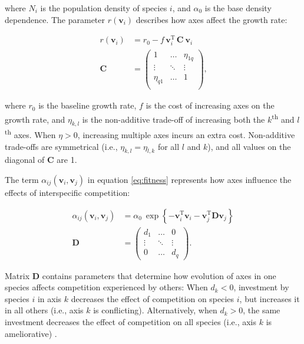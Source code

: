 \noindent where $N_i$ is the population density of species $i$,
and $\alpha_0$ is the base density dependence.
The parameter $r(\mathbf{v}_i)$ describes how axes affect
the growth rate:

\begin{equation} \label{eq:growth-rate}
\begin{split}
    r(\mathbf{v}_i) &= r_0 - f \, \mathbf{v}_i^{\textrm{T}} \, \mathbf{C} ~ \mathbf{v}_{i} \\
    \mathbf{C} &= \begin{pmatrix}
        1         & \ldots & \eta_{1q} \\
        \vdots    & \ddots & \vdots \\
        \eta_{q1} & \ldots & 1      \\
        \end{pmatrix}
    \textrm{,}
\end{split}
\end{equation}

\noindent where $r_0$ is the baseline growth rate,
$f$ is the cost of increasing axes on the growth rate, and
$\eta_{k,l}$ is the non-additive trade-off of increasing both the
$k$\textsuperscript{th} and $l$\textsuperscript{th} axes.
When $\eta > 0$, increasing multiple axes incurs an extra cost.
Non-additive trade-offs are symmetrical (i.e., $\eta_{k,l} = \eta_{l,k}$ for all
$l$ and $k$), and all values on the diagonal of $\mathbf{C}$ are 1.


The term $\alpha_{ij}(\mathbf{v}_i, \mathbf{v}_j)$
in equation \ref{eq:fitness} represents how axes influence the effects
of interspecific competition:

\begin{equation} \label{eq:competition}
\begin{split}
    \alpha_{ij}(\mathbf{v}_i, \mathbf{v}_j) &= \alpha_0 ~\exp \left\{
        - \mathbf{v}_i^{\textrm{T}} \mathbf{v}_i -
        \mathbf{v}_j^{\textrm{T}} \mathbf{D} \mathbf{v}_j \right\} \\
    \mathbf{D} &= \begin{pmatrix}
        d_1     & \ldots    & 0 \\
        \vdots  & \ddots    & \vdots \\
        0       & \ldots    & d_q
        \end{pmatrix}
	\textrm{.}
\end{split}
\end{equation}


Matrix $\mathbf{D}$ contains parameters that determine how evolution of axes
in one species affects competition experienced by others:
When $d_k < 0$, investment by species $i$ in axis $k$ decreases the
effect of competition on species $i$, but increases it in all others
(i.e., axis $k$ is conflicting).
Alternatively, when $d_k > 0$, the same investment decreases the effect of
competition on all species (i.e., axis $k$ is ameliorative)
\citep{Northfield2013a}.



